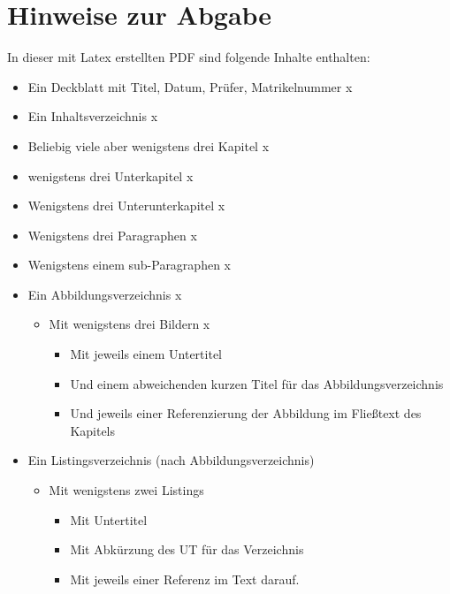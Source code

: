 \section*{Hinweise zur Abgabe}

In dieser mit Latex erstellten PDF sind folgende Inhalte enthalten: 

\begin{itemize}
    \item Ein Deckblatt mit Titel, Datum, Prüfer, Matrikelnummer x
    \item Ein Inhaltsverzeichnis                                 x
    \item Beliebig viele aber wenigstens drei Kapitel            x
    \item wenigstens drei Unterkapitel                           x
    \item Wenigstens drei Unterunterkapitel                      x
    \item Wenigstens drei Paragraphen                            x
    \item Wenigstens einem sub-Paragraphen                       x
    \item Ein Abbildungsverzeichnis                              x
    \begin{itemize}
        \item Mit wenigstens drei Bildern                        x
        \begin{itemize}
            \item Mit jeweils einem Untertitel 
            \item Und einem abweichenden kurzen Titel für das Abbildungsverzeichnis 
            \item Und jeweils einer Referenzierung der Abbildung im Fließtext des Kapitels
        \end{itemize}
    \end{itemize}
    \item Ein Listingsverzeichnis (nach Abbildungsverzeichnis)
        \begin{itemize}
            \item Mit wenigstens zwei Listings 
                \begin{itemize}
                    \item Mit Untertitel 
                    \item Mit Abkürzung des UT für das Verzeichnis
                    \item Mit jeweils einer Referenz im Text darauf. 

\end{itemize}
\end{itemize}
\end{itemize}
